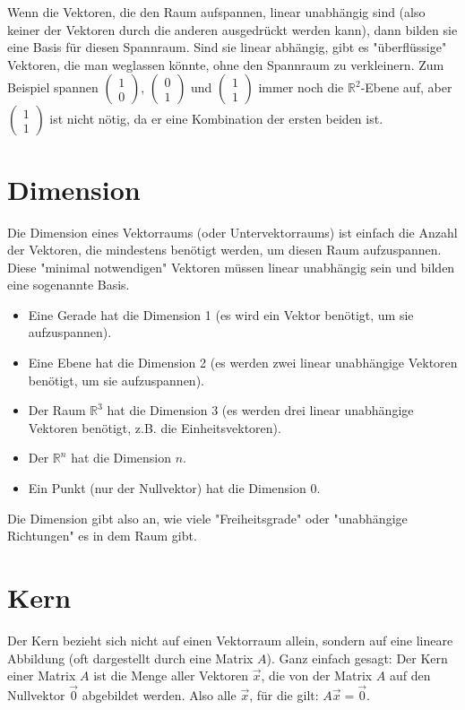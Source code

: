 Wenn die Vektoren, die den Raum aufspannen, linear unabhängig sind (also keiner der Vektoren durch die anderen ausgedrückt werden kann), dann bilden sie eine Basis für diesen Spannraum. Sind sie linear abhängig, gibt es "überflüssige" Vektoren, die man weglassen könnte, ohne den Spannraum zu verkleinern. Zum Beispiel spannen \(\begin{pmatrix} 1 \\ 0 \end{pmatrix}\), \(\begin{pmatrix} 0 \\ 1 \end{pmatrix}\) und \(\begin{pmatrix} 1 \\ 1 \end{pmatrix}\) immer noch die \(\mathbb{R}^2\)-Ebene auf, aber \(\begin{pmatrix} 1 \\ 1 \end{pmatrix}\) ist nicht nötig, da er eine Kombination der ersten beiden ist.

\section{Dimension}
Die Dimension eines Vektorraums (oder Untervektorraums) ist einfach die Anzahl der Vektoren, die mindestens benötigt werden, um diesen Raum aufzuspannen. Diese "minimal notwendigen" Vektoren müssen linear unabhängig sein und bilden eine sogenannte Basis.
\begin{itemize}
    \item Eine Gerade hat die Dimension 1 (es wird ein Vektor benötigt, um sie aufzuspannen).
    \item Eine Ebene hat die Dimension 2 (es werden zwei linear unabhängige Vektoren benötigt, um sie aufzuspannen).
    \item Der Raum \(\mathbb{R}^3\) hat die Dimension 3 (es werden drei linear unabhängige Vektoren benötigt, z.B. die Einheitsvektoren).
    \item Der \(\mathbb{R}^n\) hat die Dimension \(n\).
    \item Ein Punkt (nur der Nullvektor) hat die Dimension 0.
\end{itemize}
Die Dimension gibt also an, wie viele "Freiheitsgrade" oder "unabhängige Richtungen" es in dem Raum gibt.

\section{Kern}
Der Kern bezieht sich nicht auf einen Vektorraum allein, sondern auf eine lineare Abbildung (oft dargestellt durch eine Matrix \(A\)).
Ganz einfach gesagt: Der Kern einer Matrix \(A\) ist die Menge aller Vektoren \(\vec{x}\), die von der Matrix \(A\) auf den Nullvektor \(\vec{0}\) abgebildet werden. Also alle \(\vec{x}\), für die gilt: \(A\vec{x} = \vec{0}\).

